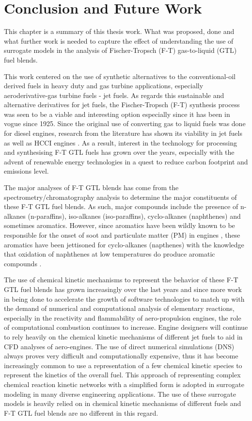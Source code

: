 \chapter{Conclusion and Future Work}


This chapter is a summary of this thesis work. What was proposed, done and what further work is needed to capture the effect of understanding the use of surrogate models in the analysis of Fischer-Tropsch (F-T) gas-to-liquid (GTL) fuel blends.

This work centered on the use of synthetic alternatives to the conventional-oil derived fuels in heavy duty and gas turbine applications, especially aeroderivative-gas turbine fuels - jet fuels. As regards this sustainable and alternative derivatives for jet fuels, the Fischer-Tropsch (F-T) synthesis process was seen to be a viable and interesting option especially since it has been in vogue since 1925. Since the original use of converting gas to liquid fuels was done for diesel engines, research from the literature has shown its viability in jet fuels \cite{Hermann2006ChemicalFuel} as well as  HCCI engines \cite{Mati2007TheModeling}. As a result, interest in the technology for processing and synthesising F-T GTL fuels has grown over the years, especially with the advent of renewable energy technologies in a quest to reduce carbon footprint and emissions level. 

The major analyses of F-T GTL blends has come from the spectrometry/chromatography analysis to determine the major constituents of these F-T GTL fuel blends. As such, major compounds include the presence of n-alkanes (n-paraffins), iso-alkanes (iso-paraffins), cyclo-alkanes (naphthenes) and sometimes aromatics. However, since aromatics have been wildly known to be responsible for the onset of soot and particulate matter (PM) in engines \cite{RoleOSTI.GOV}, these aromatics have been jettisoned for cyclo-alkanes (napthenes) with the knowledge that oxidation of naphthenes at low temperatures do produce aromatic compounds \cite{Abbasi2018KineticFormation}.

The use of chemical kinetic mechanisms to represent the behavior of these F-T GTL fuel blends has grown increasingly over the last years and since more work in being done to accelerate the growth of software technologies to match up with the demand of numerical and computational analysis of elementary reactions, especially in the reactivity and flammability of aero-propulsion engines, the role of computational combustion continues to increase. Engine designers will continue to rely heavily on the chemical kinetic mechanisms of different jet fuels to aid in CFD analyses of aero-engines. The use of direct numerical simulations (DNS) always proves very difficult and computationally expensive, thus it has become increasingly common to use a representation of a few chemical kinetic species to represent the kinetics of the overall fuel. This approach of representing complex chemical reaction kinetic networks with a simplified form is adopted in surrogate modeling in many diverse engineering applications. The use of these surrogate models is heavily relied on in chemical kinetic mechanisms of different fuels and F-T GTL fuel blends are no different in this regard. 

